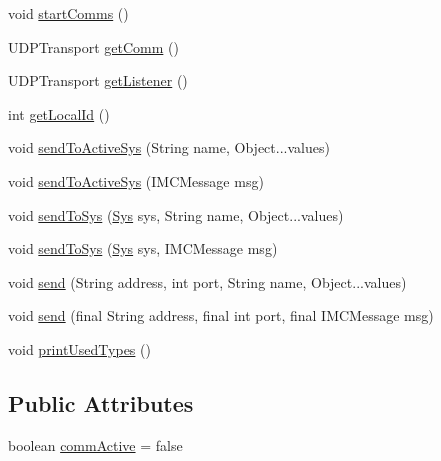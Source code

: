 \begin{DoxyCompactItemize}
\item 
void \hyperlink{classpt_1_1lsts_1_1asa_1_1managers_1_1IMCManager_a81628cd324cd6cc09098f74b6d9a4c23}{start\+Comms} ()
\item 
U\+D\+P\+Transport \hyperlink{classpt_1_1lsts_1_1asa_1_1managers_1_1IMCManager_a8cd7ce16041f8bbb2a3b7016a87e929a}{get\+Comm} ()
\item 
U\+D\+P\+Transport \hyperlink{classpt_1_1lsts_1_1asa_1_1managers_1_1IMCManager_a9be4a4a3d73a2b01b242c8f4ad87d005}{get\+Listener} ()
\item 
int \hyperlink{classpt_1_1lsts_1_1asa_1_1managers_1_1IMCManager_a37aaf44fd3850d32e440976816e9974e}{get\+Local\+Id} ()
\item 
void \hyperlink{classpt_1_1lsts_1_1asa_1_1managers_1_1IMCManager_a7b754e032cdfb9eaf601d64bfefcb5dd}{send\+To\+Active\+Sys} (String name, Object...\+values)
\item 
void \hyperlink{classpt_1_1lsts_1_1asa_1_1managers_1_1IMCManager_a10b6b0d78f803d62a91f0ec4530f9acc}{send\+To\+Active\+Sys} (I\+M\+C\+Message msg)
\item 
void \hyperlink{classpt_1_1lsts_1_1asa_1_1managers_1_1IMCManager_a3106a674836644e3dafb5ff8f2a4165b}{send\+To\+Sys} (\hyperlink{classpt_1_1lsts_1_1asa_1_1sys_1_1Sys}{Sys} sys, String name, Object...\+values)
\item 
void \hyperlink{classpt_1_1lsts_1_1asa_1_1managers_1_1IMCManager_ae7e502296424dc04b75c000a5710aca5}{send\+To\+Sys} (\hyperlink{classpt_1_1lsts_1_1asa_1_1sys_1_1Sys}{Sys} sys, I\+M\+C\+Message msg)
\item 
void \hyperlink{classpt_1_1lsts_1_1asa_1_1managers_1_1IMCManager_a34d863c0fc2bb23350e4493e12bdf6e6}{send} (String address, int port, String name, Object...\+values)
\item 
void \hyperlink{classpt_1_1lsts_1_1asa_1_1managers_1_1IMCManager_a0301beb34081dccd099764dcf72e7bd1}{send} (final String address, final int port, final I\+M\+C\+Message msg)
\item 
void \hyperlink{classpt_1_1lsts_1_1asa_1_1managers_1_1IMCManager_a463445d525f73013ee97a102907a768d}{print\+Used\+Types} ()
\end{DoxyCompactItemize}
\subsection*{Public Attributes}
\begin{DoxyCompactItemize}
\item 
boolean \hyperlink{classpt_1_1lsts_1_1asa_1_1managers_1_1IMCManager_a10248901a32daa7bdb5cc2d6525c2d0f}{comm\+Active} = false
\end{DoxyCompactItemize}
